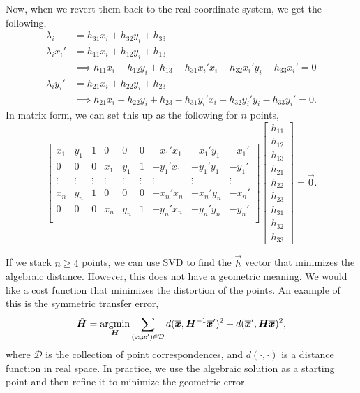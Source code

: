 Now, when we revert them back to the real coordinate system, we get the
following,
\begin{align*}
  \lambda_i &= h_{31}x_i + h_{32}y_i + h_{33} \\
  \lambda_i x_i' &= h_{11}x_i + h_{12}y_i + h_{13} \\
                 &\implies h_{11}x_i + h_{12}y_i + h_{13} - h_{31}x_i'x_i - h_{32}x_i'y_i - h_{33}x_i' = 0 \\
  \lambda_i y_i' &= h_{21}x_i + h_{22}y_i + h_{23} \\
                 &\implies h_{21}x_i + h_{22}y_i + h_{23} - h_{31}y_i'x_i - h_{32}y_i'y_i - h_{33}y_i' = 0
.\end{align*}
In matrix form, we can set this up as the following for $n$ points, \[
  \begin{bmatrix}
    x_1 & y_1 & 1 & 0 & 0 & 0 & -x_1'x_1 & -x_1'y_1 & -x_1' \\
    0 & 0 & 0 & x_1 & y_1 & 1 & -y_1'x_1 & -y_1'y_1 & -y_1' \\
    \vdots & \vdots & \vdots & \vdots & \vdots & \vdots & \vdots & \vdots & \vdots \\
    x_n & y_n & 1 & 0 & 0 & 0 & -x_n'x_n & -x_n'y_n & -x_n' \\
    0 & 0 & 0 & x_n & y_n & 1 & -y_n'x_n & -y_n'y_n & -y_n' \\
  \end{bmatrix}
  \begin{bmatrix}
    h_{11} \\
    h_{12} \\
    h_{13} \\
    h_{21} \\
    h_{22} \\
    h_{23} \\
    h_{31} \\
    h_{32} \\
    h_{33}
  \end{bmatrix}
  =
  \vec{0}
.\]

If we stack $n \geq 4$ points, we can use SVD to find the $\vec{h}$ vector that
minimizes the algebraic distance. However, this does not have a geometric
meaning. We would like a cost function that minimizes the distortion of the
points. An example of this is the symmetric transfer error, \[
  \hat{\bm{H}} = \operatorname*{argmin}_{\bm{H}}
  \sum_{(\bm{x},\bm{x}')\in\mathcal{D}}
  d(\overline{\bm{x}},\bm{H}^{-1}\overline{\bm{x}}')^2 +
  d(\overline{\bm{x}}', \bm{H}\overline{\bm{x}})^2
,\]
where $\mathcal{D}$ is the collection of point correspondences, and $d(\cdot,
\cdot)$ is a distance function in real space. In practice, we use the algebraic
solution as a starting point and then refine it to minimize the geometric error.

